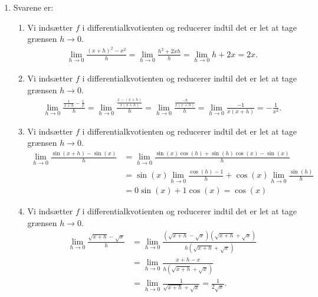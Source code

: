\begin{enumerate}
%	
	\item Svarene er:
	\begin{enumerate}
	\item Vi indsætter $f$ i differentialkvotienten og reducerer indtil det er let at tage grænsen $h\to 0$.
	\begin{align*}
	\lim_{h\to 0}\frac{(x+h)^2-x^2}{h}=\lim_{h\to 0}\frac{h^2+2xh}{h}=\lim_{h\to 0}h+2x=2x.
	\end{align*}
	\item Vi indsætter $f$ i differentialkvotienten og reducerer indtil det er let at tage grænsen $h\to 0$.
	\begin{align*}
	\lim_{h\to 0}\frac{\frac{1}{x+h}-\frac{1}{x}}{h}=\lim_{h\to 0}\frac{\frac{x-(x+h)}{x(x+h)}}{h}=\lim_{h\to 0}\frac{\frac{-h}{x(x+h)}}{h}=\lim_{h\to 0}\frac{-1}{x(x+h)}=-\frac{1}{x^2}.
	\end{align*}
	\item Vi indsætter $f$ i differentialkvotienten og reducerer indtil det er let at tage grænsen $h\to 0$.
	\begin{align*}
	\lim_{h\to 0}\frac{\sin(x+h)-\sin(x)}{h}&=\lim_{h\to 0}\frac{\sin(x)\cos(h)+\sin(h)\cos(x)-\sin(x)}{h}\\
	&=\sin(x)\lim_{h\to 0}\frac{\cos(h)-1}{h}+\cos(x)\lim_{h\to 0}\frac{\sin(h)}{h}\\
	&=0\sin(x)+1\cos(x)=\cos(x)
	\end{align*}
	\item Vi indsætter $f$ i differentialkvotienten og reducerer indtil det er let at tage grænsen $h\to 0$.
	\begin{align*}
	\lim_{h\to 0}\frac{\sqrt{x+h}-\sqrt{x}}{h}&=\lim_{h\to 0}\frac{(\sqrt{x+h}-\sqrt{x})(\sqrt{x+h}+\sqrt{x})}{h(\sqrt{x+h}+\sqrt{x})}\\
	&=\lim_{h\to 0}\frac{x+h-x}{h(\sqrt{x+h}+\sqrt{x})}\\
	&=\lim_{h\to 0}\frac{1}{\sqrt{x+h}+\sqrt{x}}=\frac{1}{2\sqrt{x}}.
	\end{align*}
\end{enumerate}
	

\end{enumerate}
